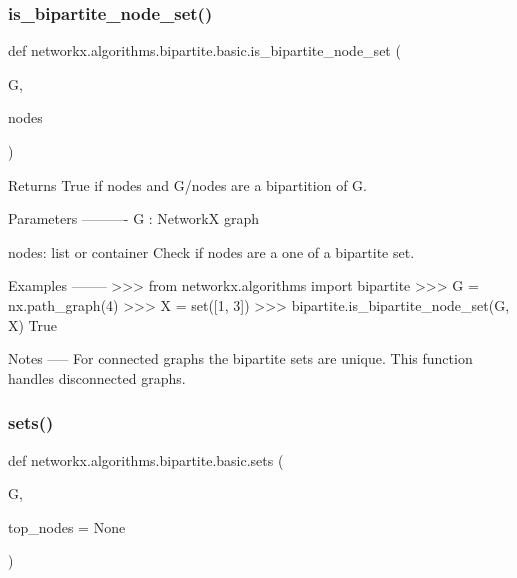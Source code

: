 \subsubsection{\texorpdfstring{is\+\_\+bipartite\+\_\+node\+\_\+set()}{is\_bipartite\_node\_set()}}
{\footnotesize\ttfamily def networkx.\+algorithms.\+bipartite.\+basic.\+is\+\_\+bipartite\+\_\+node\+\_\+set (\begin{DoxyParamCaption}\item[{}]{G,  }\item[{}]{nodes }\end{DoxyParamCaption})}

\begin{DoxyVerb}Returns True if nodes and G/nodes are a bipartition of G.

Parameters
----------
G : NetworkX graph

nodes: list or container
  Check if nodes are a one of a bipartite set.

Examples
--------
>>> from networkx.algorithms import bipartite
>>> G = nx.path_graph(4)
>>> X = set([1, 3])
>>> bipartite.is_bipartite_node_set(G, X)
True

Notes
-----
For connected graphs the bipartite sets are unique.  This function handles
disconnected graphs.
\end{DoxyVerb}
 \mbox{\label{namespacenetworkx_1_1algorithms_1_1bipartite_1_1basic_aacbc287cbc9094e5b488d5e3791cc964}} 
\subsubsection{\texorpdfstring{sets()}{sets()}}
{\footnotesize\ttfamily def networkx.\+algorithms.\+bipartite.\+basic.\+sets (\begin{DoxyParamCaption}\item[{}]{G,  }\item[{}]{top\+\_\+nodes = {\ttfamily None} }\end{DoxyParamCaption})}

